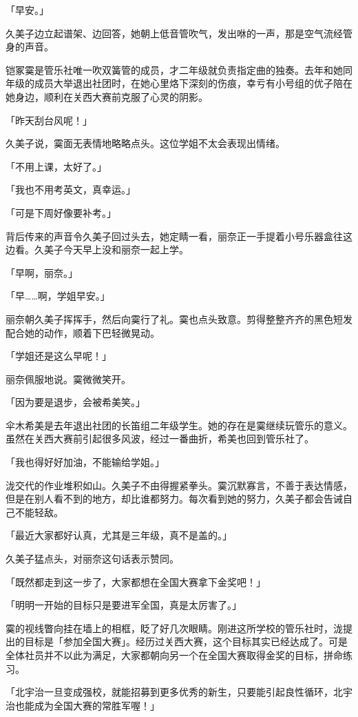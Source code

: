 \documentclass[UTF8]{ctexart}
\begin{document}
    「早安。」 

    久美子边立起谱架、边回答，她朝上低音管吹气，发出咻的一声，那是空气流经管身的声音。 

    铠冢霙是管乐社唯一吹双簧管的成员，才二年级就负责指定曲的独奏。去年和她同年级的成员大举退出社团时，在她心里烙下深刻的伤痕，幸亏有小号组的优子陪在她身边，顺利在关西大赛前克服了心灵的阴影。 

    「昨天刮台风呢！」 

    久美子说，霙面无表情地略略点头。这位学姐不太会表现出情绪。 

    「不用上课，太好了。」 

    「我也不用考英文，真幸运。」 

    「可是下周好像要补考。」 

    背后传来的声音令久美子回过头去，她定睛一看，丽奈正一手提着小号乐器盒往这边看。久美子今天早上没和丽奈一起上学。 

    「早啊，丽奈。」 

    「早……啊，学姐早安。」 

    丽奈朝久美子挥挥手，然后向霙行了礼。霙也点头致意。剪得整整齐齐的黑色短发配合她的动作，顺着下巴轻微晃动。 

    「学姐还是这么早呢！」 

    丽奈佩服地说。霙微微笑开。 

    「因为要是退步，会被希美笑。」 

    伞木希美是去年退出社团的长笛组二年级学生。她的存在是霙继续玩管乐的意义。虽然在关西大赛前引起很多风波，经过一番曲折，希美也回到管乐社了。 

    「我也得好好加油，不能输给学姐。」 

    泷交代的作业堆积如山。久美子不由得握紧拳头。霙沉默寡言，不善于表达情感，但是在别人看不到的地方，却比谁都努力。每次看到她的努力，久美子都会告诫自己不能轻敌。 

    「最近大家都好认真，尤其是三年级，真不是盖的。」 

    久美子猛点头，对丽奈这句话表示赞同。 

    「既然都走到这一步了，大家都想在全国大赛拿下金奖吧！」 

    「明明一开始的目标只是要进军全国，真是太厉害了。」 

    霙的视线瞥向挂在墙上的相框，眨了好几次眼睛。刚进这所学校的管乐社时，泷提出的目标是「参加全国大赛」。经历过关西大赛，这个目标其实已经达成了。可是全体社员并不以此为满足，大家都朝向另一个在全国大赛取得金奖的目标，拼命练习。 

    「北宇治一旦变成强校，就能招募到更多优秀的新生，只要能引起良性循环，北宇治也能成为全国大赛的常胜军喔！」 
\end{document}
